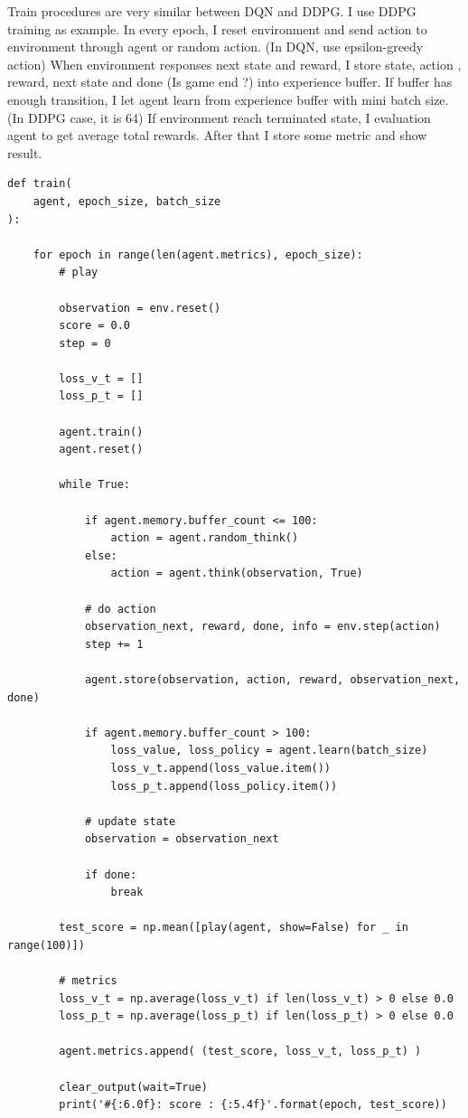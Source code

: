 \documentclass[12pt]{article}
\begin{document}
Train procedures are very similar between DQN and DDPG. I use DDPG training as example. In every epoch, I reset environment and send action to environment through agent or random action. (In DQN, use epsilon-greedy action) When environment responses next state and reward, I store state, action , reward, next state and done (Is game end ?) into experience buffer. If buffer has enough transition, I let agent learn from experience buffer with mini batch size. (In DDPG case, it is 64) If environment reach terminated state, I evaluation agent to get average total rewards. After that I store some metric and show result. 

\begin{verbatim}
def train(
    agent, epoch_size, batch_size
):
    
    for epoch in range(len(agent.metrics), epoch_size):
        # play
        
        observation = env.reset()
        score = 0.0
        step = 0
        
        loss_v_t = []
        loss_p_t = []
        
        agent.train()
        agent.reset()
        
        while True:
            
            if agent.memory.buffer_count <= 100:
                action = agent.random_think()
            else:
                action = agent.think(observation, True)
                
            # do action
            observation_next, reward, done, info = env.step(action)
            step += 1
            
            agent.store(observation, action, reward, observation_next, done)
            
            if agent.memory.buffer_count > 100:
                loss_value, loss_policy = agent.learn(batch_size)
                loss_v_t.append(loss_value.item())
                loss_p_t.append(loss_policy.item())
            
            # update state
            observation = observation_next
            
            if done:
                break
        
        test_score = np.mean([play(agent, show=False) for _ in range(100)])
        
        # metrics
        loss_v_t = np.average(loss_v_t) if len(loss_v_t) > 0 else 0.0
        loss_p_t = np.average(loss_p_t) if len(loss_p_t) > 0 else 0.0
            
        agent.metrics.append( (test_score, loss_v_t, loss_p_t) )
        
        clear_output(wait=True)
        print('#{:6.0f}: score : {:5.4f}'.format(epoch, test_score))
\end{verbatim}
\end{document}
